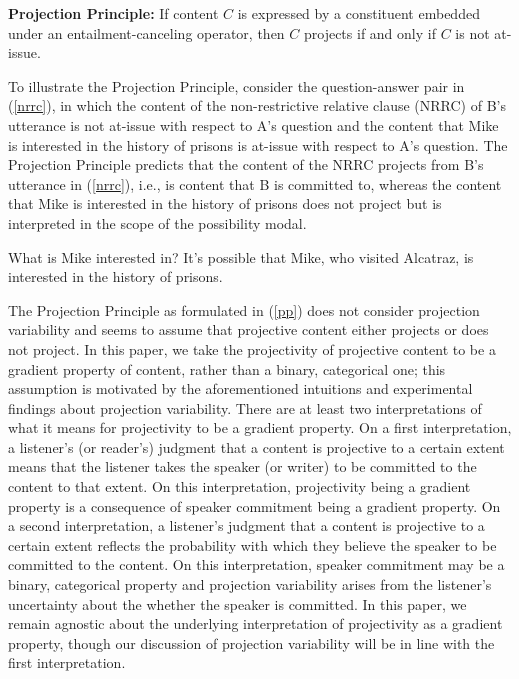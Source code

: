 \documentclass[11pt,fleqn]{article}
\newcommand{\6}{\mbox{$[\hspace*{-.6mm}[$}}
\newcommand{\9}{\mbox{$]\hspace*{-.6mm}]$}}
\def\infelic{{\leavevmode\llap{\#}}}
\begin{document}
\begin{exe}
\ex\label{pp} {\bf Projection Principle:} If content $C$ is expressed by a constituent embedded under an entailment-canceling operator, then $C$ projects if and only if $C$ is not at-issue.

\end{exe} 
To illustrate the Projection Principle, consider the question-answer pair in (\ref{nrrc}), in which the content of the non-restrictive relative clause (NRRC) of B's utterance is not at-issue with respect to A's question and the content that Mike is interested in the history of prisons is at-issue with respect to A's question. The Projection Principle predicts that the content of the NRRC projects from B's utterance in (\ref{nrrc}), i.e., is content that B is committed to, whereas the content that Mike is interested in the history of prisons does not project but is interpreted in the scope of the possibility modal.

\begin{exe}
\ex\label{nrrc}
\begin{xlist}
 What is Mike interested in?
 It's possible that Mike, who visited Alcatraz, is interested in the history of prisons.
\end{xlist}


\end{exe}
The Projection Principle as formulated in (\ref{pp}) does not consider projection variability and seems to assume that projective content either projects or does not project. In this paper, we take the projectivity of projective content to be a gradient property of content, rather than a binary, categorical one; this assumption is motivated by the aforementioned intuitions and experimental findings about projection variability. There are at least two interpretations of what it means for projectivity to be a gradient property. On a first interpretation, a listener's (or reader's) judgment that a content is projective to a certain extent means that the listener takes the speaker (or writer) to be committed to the content to that extent. On this interpretation, projectivity being a gradient property is a consequence of speaker commitment being a gradient property. On a second interpretation, a listener's judgment that a content is projective to a certain extent reflects the probability with which they believe the speaker to be committed to the content. On this interpretation, speaker commitment may be a binary, categorical property and projection variability arises from the listener's uncertainty about the whether the speaker is committed. In this paper, we remain agnostic about the underlying interpretation of projectivity as a gradient property, though our discussion of projection variability will be in line with the first interpretation.
\end{document}
